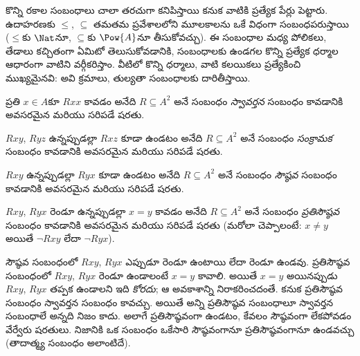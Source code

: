 \documentclass[../../../include/open-logic-section]{subfiles}
\begin{document}

\begin{intro}
కొన్ని రకాల సంబంధాలు చాలా తరచుగా కనిపిస్తాయి కనుక వాటికి ప్రత్యేక
పేర్లు పెట్టారు. ఉదాహరణకు $\le$, $\subseteq$ తమతమ ప్రవేశాలలోని
మూలకాలను ఒకే విధంగా సంబంధపరుస్తాయి
($\le$కు $\Nat$నూ, $\subseteq$కు $\Pow{A}$నూ తీసుకోవచ్చు).
ఈ సంబంధాల మధ్య పోలికలు, తేడాలు కచ్చితంగా ఏమిటో తెలుసుకోవడానికి,
సంబంధాలకు ఉండగల కొన్ని ప్రత్యేక ధర్మాల ఆధారంగా వాటిని వర్గీకరిస్తాం.
వీటిలో కొన్ని ధర్మాలు, వాటి కలయికలు ప్రత్యేకించి ముఖ్యమైనవి:
అవి క్రమాలు, తుల్యతా సంబంధాలకు దారితీస్తాయి.
\end{intro}

\begin{defn}[స్వావర్తనత్వం]
ప్రతి $x \in A$కూ $Rxx$ కావడం అనేది $R \subseteq A^2$
అనే సంబంధం \emph{స్వావర్తన} సంబంధం కావడానికి అవసరమైన మరియు సరిపడే షరతు.
\end{defn}

\begin{defn}[సంక్రామకత్వం]
$Rxy$, $Ryz$ ఉన్నప్పుడల్లా $Rxz$ కూడా ఉండటం అనేది
$R \subseteq A^2$ అనే సంబంధం \emph{సంక్రామక} సంబంధం కావడానికి
అవసరమైన మరియు సరిపడే షరతు.
\end{defn}

\begin{defn}[సౌష్ఠవం]
$Rxy$ ఉన్నప్పుడల్లా $Ryx$ కూడా ఉండటం అనేది
$R \subseteq A^2$ అనే సంబంధం \emph{సౌష్ఠవ} సంబంధం కావడానికి
అవసరమైన మరియు సరిపడే షరతు.
\end{defn}

\begin{defn}[ప్రతిసౌష్ఠవం]
$Rxy$, $Ryx$ రెండూ ఉన్నప్పుడల్లా $x=y$ కావడం అనేది
$R \subseteq A^2$ అనే సంబంధం \emph{ప్రతిసౌష్ఠవ} సంబంధం కావడానికి
అవసరమైన మరియు సరిపడే షరతు (మరోలా చెప్పాలంటే:
$x\neq y$ అయితే $\lnot Rxy$ లేదా $\lnot Ryx$).
\end{defn}

\begin{explain}
సౌష్ఠవ సంబంధంలో $Rxy$, $Ryx$ ఎప్పుడూ రెండూ ఉంటాయి లేదా రెండూ ఉండవు.
ప్రతిసౌష్ఠవ సంబంధంలో $Rxy$, $Ryx$ రెండూ ఉండాలంటే $x = y$ కావాలి.
అయితే $x = y$ అయినప్పుడు $Rxy$, $Ryx$ తప్పక ఉండాలని ఇది
\emph{కోరదు}; ఆ అవకాశాన్ని నిరాకరించదంతే.
కనుక ప్రతిసౌష్ఠవ సంబంధం స్వావర్తన సంబంధం కావచ్చు. అయితే అన్ని
ప్రతిసౌష్ఠవ సంబంధాలూ స్వావర్తన సంబంధాలే అన్నది నిజం కాదు.
అలాగే ప్రతిసౌష్ఠవంగా ఉండటం, కేవలం సౌష్ఠవంగా లేకపోవడం వేర్వేరు షరతులు.
నిజానికి ఒక సంబంధం ఒకేసారి సౌష్ఠవంగానూ ప్రతిసౌష్ఠవంగానూ ఉండవచ్చు
(తాదాత్మ్య సంబంధం అలాంటిదే).
\end{explain}
\end{document}
